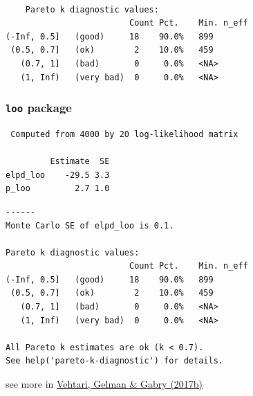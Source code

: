 \documentclass[10pt]{beamer}
\begin{document}
\begin{frame}[fragile]

  \\
  {\scriptsize
\begin{lstlisting}
    Pareto k diagnostic values:
                         Count Pct.    Min. n_eff
(-Inf, 0.5]   (good)     18    90.0%   899
 (0.5, 0.7]   (ok)        2    10.0%   459
   (0.7, 1]   (bad)       0     0.0%   <NA>
   (1, Inf)   (very bad)  0     0.0%   <NA>
\end{lstlisting}
}

\end{frame}

\begin{frame}[fragile]

\frametitle{{\tt loo} package}

  {\scriptsize
    {\color{gray}
\begin{lstlisting}
 Computed from 4000 by 20 log-likelihood matrix

         Estimate  SE
elpd_loo    -29.5 3.3
p_loo         2.7 1.0
\end{lstlisting}
      }
\begin{lstlisting}
------
Monte Carlo SE of elpd_loo is 0.1.

Pareto k diagnostic values:
                         Count Pct.    Min. n_eff
(-Inf, 0.5]   (good)     18    90.0%   899
 (0.5, 0.7]   (ok)        2    10.0%   459
   (0.7, 1]   (bad)       0     0.0%   <NA>
   (1, Inf)   (very bad)  0     0.0%   <NA>

All Pareto k estimates are ok (k < 0.7).
See help('pareto-k-diagnostic') for details.
\end{lstlisting}
    }

    {\vspace{2\baselineskip}\small see more in \href{http://link.springer.com/article/10.1007/s11222-016-9696-4}{Vehtari, Gelman \& Gabry (2017b)}}

\end{frame}
\end{document}
